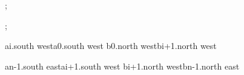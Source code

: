 ;


;

\bracetobrace
    {ai.south west}{a0.south west}
    {b0.north west}{bi+1.north west}

\bracetobrace
    {an-1.south east}{ai+1.south west}
    {bi+1.north west}{bn-1.north east}
